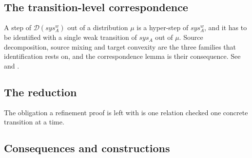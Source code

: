 \subsection{The transition-level correspondence}

A step of $\mathcal{D}(sys_A^w)$ out of a distribution $\mu$ is a hyper-step of $sys_A^w$, and it has to be identified with a single weak transition of $sys_A$ out of $\mu$.
Source decomposition, source mixing and target convexity are the three families that identification rests on, and the correspondence lemma is their consequence.
See  and .






\subsection{The reduction}

The obligation a refinement proof is left with is one relation checked one concrete transition at a time.




\subsection{Consequences and constructions}

